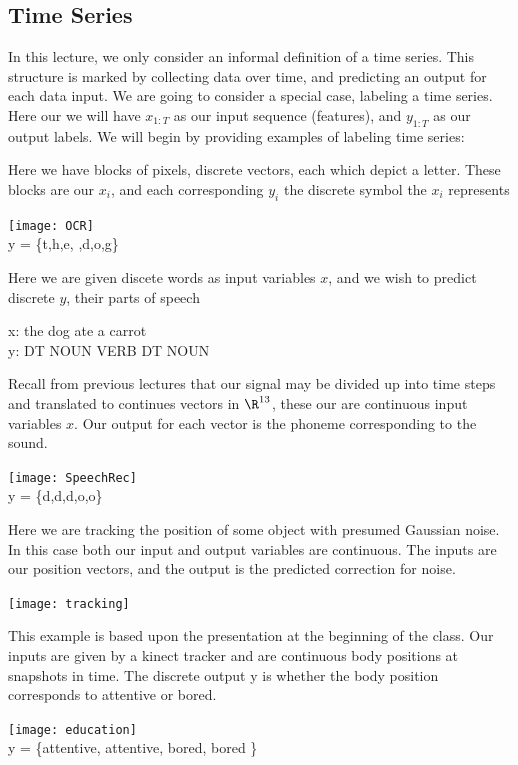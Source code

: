 \documentclass{article}
\begin{document}
\subsection{Time Series}
In this lecture, we only consider an informal definition of a time series. This structure is marked by collecting data over time, and predicting an output for each data input.
We are going to consider a special case, labeling a time series. Here our we will have $x_{1:T}$ as our input sequence (features), and $y_{1:T}$ as our output labels. We will begin by providing examples of labeling time series:
\begin{example}[OCR]
Here we have blocks of pixels, discrete vectors, each which depict a letter. These blocks are our $x_i$, and each corresponding $y_i$ the discrete symbol the $x_i$ represents
\begin{center}
\texttt{[image: OCR]} \\
y = \{t,h,e, ,d,o,g\}
\end{center}
\end{example}
\begin{example}[NLP]
Here we are given discete words as input variables $x$, and we wish to predict discrete $y$, their parts of speech
\begin{center}
x: the dog ate a carrot \\
y: DT NOUN VERB DT NOUN
\end{center}
\end{example}
\begin{example}
Recall from previous lectures that our signal may be divided up into time steps and translated to continues vectors in $\R^{13}$, these our are continuous input variables $x$. Our output for each vector is the phoneme corresponding to the sound.
\begin{center}
\texttt{[image: SpeechRec]} \\
y = \{d,d,d,o,o\}
\end{center}
\end{example}
\begin{example}[Tracking]
Here we are tracking the position of some object with presumed Gaussian noise. In this case both our input and output variables are continuous. The inputs are our position vectors, and the output is the predicted correction for noise.
\begin{center}
\texttt{[image: tracking]} 
\end{center}
\end{example}
\begin{example}[Education]
This example is based upon the presentation at the beginning of the class. Our inputs are given by a kinect tracker and are continuous body positions at snapshots in time. The discrete output y is whether the body position corresponds to attentive or bored.
\begin{center}
\texttt{[image: education]} \\
y = \{attentive, attentive, bored, bored \}
\end{center}
\end{example}
\end{document}
